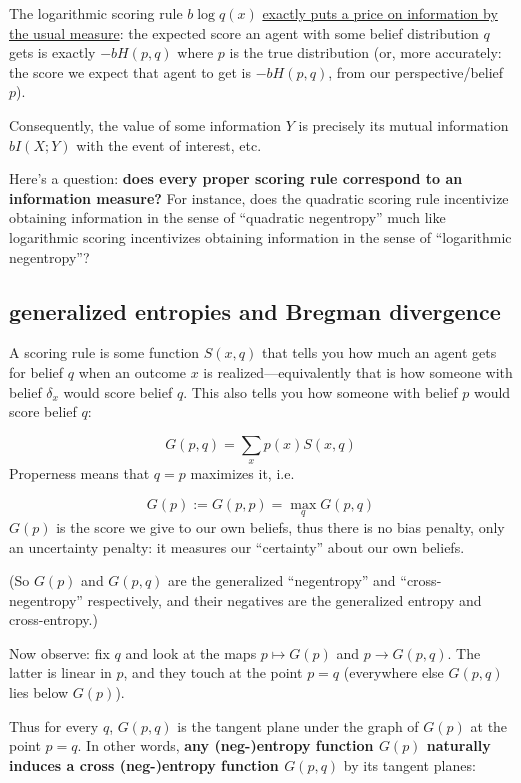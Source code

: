 The logarithmic scoring rule \(b\log q(x)\) \href{https://www.lesswrong.com/posts/fCGXK7oyhM4ei77gt/lmsr-subsidy-parameter-is-the-price-of-information}{exactly puts a price on information by the usual measure}: the expected score an agent with some belief distribution \(q\) gets is exactly \(-bH(p,q)\) where \(p\) is the true distribution (or, more accurately: the score we expect that agent to get is \(-bH(p,q)\), from our perspective/belief \(p\)).

Consequently, the value of some information \(Y\) is precisely its mutual information \(bI(X;Y)\) with the event of interest, etc.

Here's a question: \textbf{does every proper scoring rule correspond to an information measure?} For instance, does the quadratic scoring rule incentivize obtaining information in the sense of ``quadratic negentropy'' much like logarithmic scoring incentivizes obtaining information in the sense of ``logarithmic negentropy''?

\hypertarget{generalized-entropies-and-bregman-divergence}{%
\subsection{generalized entropies and Bregman divergence}\label{generalized-entropies-and-bregman-divergence}}

A scoring rule is some function \(S(x, q)\) that tells you how much an agent gets for belief \(q\) when an outcome \(x\) is realized---equivalently that is how someone with belief \(\delta_x\) would score belief \(q\). This also tells you how someone with belief \(p\) would score belief \(q\):

\[G(p,q)=\sum_x p(x)S(x,q)\] Properness means that \(q=p\) maximizes it, i.e.

\[G(p):=G(p,p)=\max_q G(p,q)\] \(G(p)\) is the score we give to our own beliefs, thus there is no bias penalty, only an uncertainty penalty: it measures our ``certainty'' about our own beliefs.

(So \(G(p)\) and \(G(p,q)\) are the generalized ``negentropy'' and ``cross-negentropy'' respectively, and their negatives are the generalized entropy and cross-entropy.)

Now observe: fix \(q\) and look at the maps \(p\mapsto G(p)\) and \(p\to G(p,q)\). The latter is linear in \(p\), and they touch at the point \(p=q\) (everywhere else \(G(p,q)\) lies below \(G(p)\)).

Thus for every \(q\), \(G(p,q)\) is the tangent plane under the graph of \(G(p)\) at the point \(p=q\). In other words, \textbf{any (neg-)entropy function \(G(p)\) naturally induces a cross (neg-)entropy function \(G(p,q)\)} by its tangent planes:

